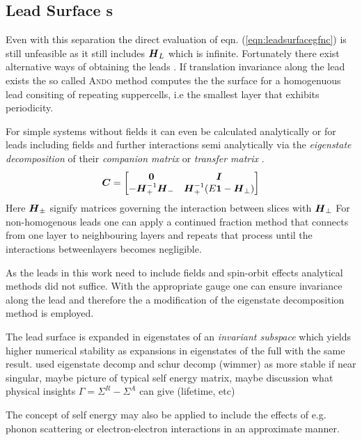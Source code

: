 \subsection{Lead Surface \cgfnc s}
Even with this separation the direct evaluation of eqn. (\ref{eqn:leadsurfacegfnc}) is still unfeasible as it still includes $\boldsymbol{H}_L$ which is infinite. Fortunately there exist alternative ways of obtaining the leads \gfnc{}.
If translation invariance along the lead exists the so called \textsc{Ando} method \cite{PhysRevB.44.8017} computes the the surface \gfnc{} for a homogenuous lead consiting of repeating suppercells, i.e the smallest layer that exhibits periodicity.\par
For simple systems without fields it can even be calculated analytically \cite{Datta1997} or for leads including fields and further interactions semi analytically via the \emph{eigenstate decomposition} of their \emph{companion matrix} or \emph{transfer matrix} \cite{PhysRevB.55.5266} \cite{PhysRevB.66.205319}.
\begin{align}
  \boldsymbol{C} =
  \begin{bmatrix}
  \boldsymbol{0}  &\boldsymbol{I} \\
  -\boldsymbol{H}_{+}^{-1}\boldsymbol{H}_{-} &\boldsymbol{H}_{+}^{-1} (E\boldsymbol{1} - \boldsymbol{H}_{\perp})
  \end{bmatrix}
  \label{eqn:greendivided}
\end{align}
Here $\boldsymbol{H}_{\pm}$ signify matrices governing the interaction between slices with \hamil{} $\boldsymbol{H}_{\perp}$
For non-homogenous leads one can apply a continued fraction method \cite{Velev2004} that connects \gfnc{} from one layer to neighbouring layers and repeats that process until the interactions betweenlayers becomes negligible.\par
As the leads in this work need to include fields and spin-orbit effects analytical methods did not suffice. With the appropriate gauge one can ensure invariance along the lead and therefore the a modification of the eigenstate decomposition method is employed.\par
The lead surface \gnfc{} is expanded in eigenstates of an \emph{invariant subspace} which yields higher numerical stability as expansions in eigenstates of the full \hamil{} with the same result.
used eigenstate decomp and schur decomp (wimmer) as more stable if near singular, maybe picture of typical self energy matrix, maybe discussion what physical insights $\Gamma = \Sigma^R - \Sigma^A$ can give (lifetime, etc)

The concept of self energy may also be applied to include the effects of e.g. phonon scattering or electron-electron interactions in an approximate manner.

